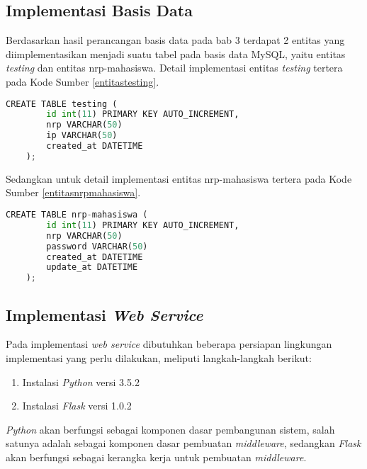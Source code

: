   \subsection{Implementasi Basis Data}
  Berdasarkan hasil perancangan basis data pada bab 3 terdapat 2 entitas yang diimplementasikan menjadi suatu tabel pada basis data MySQL, yaitu entitas \textit{testing} dan entitas nrp-mahasiswa. Detail implementasi entitas \textit{testing} tertera pada Kode Sumber \ref{entitastesting}.
  \newline
  \begin{minipage}{\linewidth}
  	\begin{lstlisting}[language=python, caption=\textit{Query} untuk membuat tabel testing,label=entitastesting]
  	CREATE TABLE testing (
	  	id int(11) PRIMARY KEY AUTO_INCREMENT,
	  	nrp VARCHAR(50)
	  	ip VARCHAR(50)
	  	created_at DATETIME
  	);
  	\end{lstlisting}
  \end{minipage}
  Sedangkan untuk detail implementasi entitas nrp-mahasiswa tertera pada Kode Sumber \ref{entitasnrpmahasiswa}.
    \newline
    \begin{minipage}{\linewidth}
    \begin{lstlisting}[language=python, caption=\textit{Query} untuk membuat tabel testing,label=entitasnrpmahasiswa]
    CREATE TABLE nrp-mahasiswa (
    	id int(11) PRIMARY KEY AUTO_INCREMENT,
    	nrp VARCHAR(50)
    	password VARCHAR(50)
    	created_at DATETIME
    	update_at DATETIME
    );
    \end{lstlisting}
    \end{minipage}
    
  \subsection{Implementasi \textit{Web Service}}
  Pada implementasi \textit{web service} dibutuhkan beberapa persiapan lingkungan implementasi yang perlu dilakukan, meliputi langkah-langkah berikut:
    \begin{enumerate}
    	\item Instalasi \textit{Python} versi 3.5.2
    	\item Instalasi \textit{Flask} versi 1.0.2
    \end{enumerate}
  \textit{Python} akan berfungsi sebagai komponen dasar pembangunan sistem, salah satunya adalah sebagai komponen dasar pembuatan \textit{middleware}, sedangkan \textit{Flask} akan berfungsi sebagai kerangka kerja untuk pembuatan \textit{middleware}.
